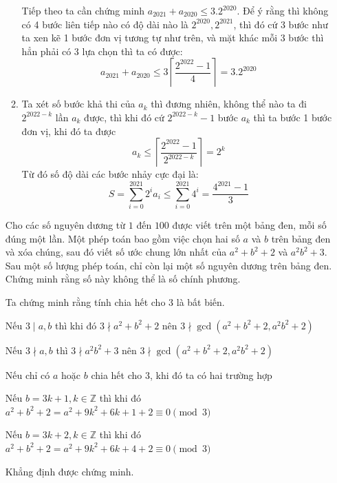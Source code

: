 \documentclass[11pt]{scrartcl}
\begin{document}
\begin{itemize}[label=, leftmargin=0em, itemsep=0.5em]
\begin{sol}
\begin{enumerate}
$$            $$
            Tiếp theo ta cần chứng minh $a_{2021} + a_{2020} \leq 3.2^{2020}$. Để ý rằng thì không có 4 bước liên tiếp nào có độ dài nào là $2^{2020},2^{2021}$, thì đó cứ 3 bước như ta xen kẽ 1 bước đơn vị tương tự như trên, và mặt khác mỗi 3 bước thì hẳn phải có 3 lựa chọn thì ta có được:
            $$
            a_{2021} + a_{2020} \leq 3\left\lceil \frac{2^{2022} - 1}{4}\right\rceil = 3.2^{2020}
            $$
            \item Ta xét số bước khả thi của $a_k$ thì đương nhiên, không thể nào ta đi $2^{2022 - k}$ lần $a_k$ được, thì khi đó cứ $2^{2022 - k} - 1$ bước $a_k$ thì ta bước 1 bước đơn vị, khi đó ta được
            $$
            a_k \leq \left\lceil \frac{2^{2022} - 1}{2^{2022 - k}} \right\rceil = 2^k
            $$
            Từ đó số độ dài các bước nhảy cực đại là:
            $$
            S = \sum_{i = 0}^{2021} 2^i a_i \leq \sum_{i=0}^{2021} 4^i = \frac{4^{2021}- 1}{3}
            $$
            \end{enumerate}
    \end{sol}
    \begin{bt}
        Cho các số nguyên dương từ $1$ đến $100$ được viết trên một bảng đen, mỗi số đúng một lần. Một phép toán bao gồm việc chọn hai số $a$ và $b$ trên bảng đen và xóa chúng, sau đó viết số ước chung lớn nhất của $a^2+b^2+2$ và $a^2b^2+3$. Sau một số lượng phép toán, chỉ còn lại một số nguyên dương trên bảng đen. Chứng minh rằng số này không thể là số chính phương.
    \end{bt}

    \begin{sol}
        Ta chứng minh rằng tính chia hết cho $3$ là bất biến. 
        
        Nếu $3 \mid a,b$ thì khi đó $3\nmid a^2 + b^2 + 2$ nên $3 \nmid \gcd(a^2 + b^2 + 2, a^2b^2 + 2)$


        Nếu $3 \nmid a,b$ thì $3\nmid a^2b^2 +3$ nên $3 \nmid \gcd(a^2 + b^2 + 2, a^2b^2 + 2)$


        Nếu chỉ có $a$ hoặc $b$ chia hết cho $3$, khi đó ta có hai trường hợp


        Nếu $b = 3k + 1, k \in \mathbb{Z}$ thì khi đó $a^2 + b^2 + 2 = a^2 + 9k^2 + 6k + 1 + 2 \equiv 0 \pmod{3}$


        Nếu $b = 3k + 2, k \in \mathbb{Z}$ thì khi đó $a^2 + b^2 + 2 = a^2 +9k^2 + 6k + 4 + 2 \equiv 0 \pmod{3}$


        Khẳng định được chứng minh.



\end{sol}
\end{itemize}
\end{document}
